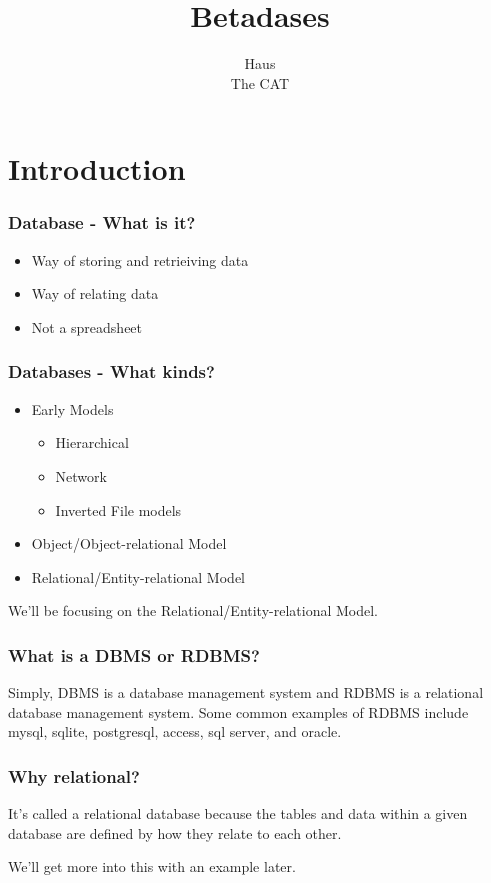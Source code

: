 \documentclass{beamer}
\title{Betadases}
\author{
Haus \\
The CAT
}
\begin{document}
\begin{frame}
  \titlepage
\end{frame}

\section{Introduction}

\begin{frame}
  \frametitle{Database - What is it?}
  \begin{itemize}
    \item Way of storing and retrieiving data
    \item Way of relating data
    \item Not a spreadsheet
  \end{itemize}
\end{frame}

\begin{frame}
  \frametitle{Databases - What kinds?}
  \begin{itemize}
    \item Early Models
    \begin{itemize}
      \item Hierarchical
      \item Network
      \item Inverted File models
    \end{itemize}
    \item Object/Object-relational Model
    \item Relational/Entity-relational Model
  \end{itemize}
	\pause
	We'll be focusing on the Relational/Entity-relational Model.
\end{frame}

\begin{frame}
  \frametitle{What is a DBMS or RDBMS?}
Simply, DBMS is a database management system and RDBMS is a relational database management system. Some common examples of RDBMS include mysql, sqlite, postgresql, access, sql server, and oracle.
\end{frame}

\begin{frame}
  \frametitle{Why relational?}
It's called a relational database because the tables and data within a given database are defined by how they relate to each other. 

We'll get more into this with an example later.
\end{frame}
\end{document}
